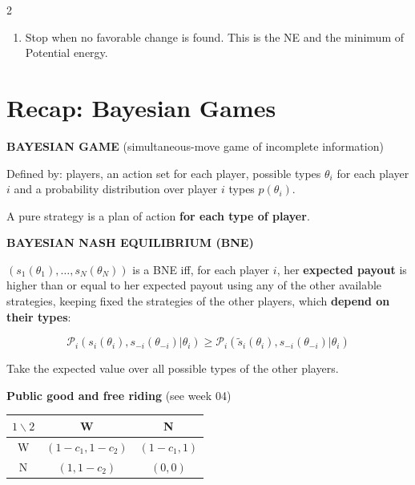 \documentclass[a4paper,9pt]{extarticle}
\begin{document}
\begin{multicols}{2}
\begin{summary}
\begin{enumerate}
\item Stop when no favorable change is found. This is the NE and the minimum of Potential
energy.

\end{enumerate}

\end{summary}



\section{Recap: Bayesian Games}


\begin{definition}

\textbf{BAYESIAN GAME} (simultaneous-move game of incomplete information)

Defined by: players, an action set for each player, possible types $\theta_i$ for each player
$i$ and a probability distribution over player $i$ types $p(\theta_i)$.

A pure strategy is a plan of action \textbf{for each type of player}.

\end{definition}


\begin{definition}

\textbf{BAYESIAN NASH EQUILIBRIUM (BNE)}

$(s_1(\theta_1), \dots, s_N(\theta_N))$ is a BNE iff, for each player $i$, her
\textbf{expected payout} is higher than or equal to her expected payout using any of the other
available strategies, keeping fixed the strategies of the other players, which \textbf{depend
on their types}:

\[
\mathcal{P}_i(s_i(\theta_i), s_{-i}(\theta_{-i}) | \theta_i) \ge
\mathcal{P}_i(\tilde{s}_i(\theta_i), s_{-i}(\theta_{-i}) | \theta_i)
\]

Take the expected value over all possible types of the other players.

\end{definition}


\begin{example}

\textbf{Public good and free riding} (see week 04)

\begin{center}
\begin{tabular}{c|cc}
$1 \backslash 2$ & W & N \\
\hline
W & $(1-c_1, 1-c_2)$ & $(1-c_1, 1)$ \\
N & $(1, 1-c_2)$ & $(0,0)$ \\
\end{tabular}
\end{center}


\end{example}
\end{multicols}
\end{document}
